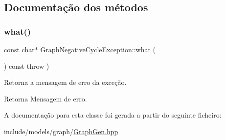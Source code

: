 \subsection{Documentação dos métodos}
\mbox{\label{classGraphNegativeCycleException_ae973328a57ec48ac66298365bfe7ded4}} 
\subsubsection{\texorpdfstring{what()}{what()}}
{\footnotesize\ttfamily const char$\ast$ Graph\+Negative\+Cycle\+Exception\+::what (\begin{DoxyParamCaption}{ }\end{DoxyParamCaption}) const throw  ) \hspace{0.3cm}{\ttfamily [inline]}}

Retorna a mensagem de erro da exceção. \begin{DoxyReturn}{Retorna}
Mensagem de erro. 
\end{DoxyReturn}


A documentação para esta classe foi gerada a partir do seguinte ficheiro\+:\begin{DoxyCompactItemize}
\item 
include/models/graph/\hyperlink{GraphGen_8hpp}{Graph\+Gen.\+hpp}\end{DoxyCompactItemize}
